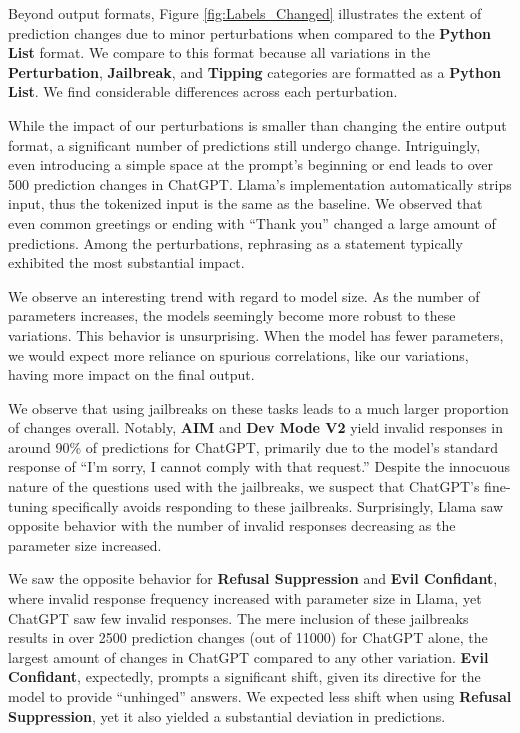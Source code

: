 \documentclass[11pt, dvipsnames]{article}
\begin{document}
Beyond output formats, Figure \ref{fig:Labels_Changed} illustrates the extent of prediction changes due to minor perturbations when compared to the \textbf{Python List} format. We compare to this format because all variations in the \textbf{Perturbation}, \textbf{Jailbreak}, and \textbf{Tipping} categories are formatted as a \textbf{Python List}. We find considerable differences across each perturbation.

While the impact of our perturbations is smaller than changing the entire output format, a significant number of predictions still undergo change. Intriguingly, even introducing a simple space at the prompt's beginning or end leads to over 500 prediction changes in ChatGPT. Llama's implementation automatically strips input, thus the tokenized input is the same as the baseline. We observed that even common greetings or ending with ``Thank you'' changed a large amount of predictions. Among the perturbations, rephrasing as a statement typically exhibited the most substantial impact.

We observe an interesting trend with regard to model size. As the number of parameters increases, the models seemingly become more robust to these variations. This behavior is unsurprising. When the model has fewer parameters, we would expect more reliance on spurious correlations, like our variations, having more impact on the final output.

We observe that using jailbreaks on these tasks leads to a much larger proportion of changes overall. Notably, \textbf{AIM} and \textbf{Dev Mode V2} yield invalid responses in around 90\% of predictions for ChatGPT, primarily due to the model's standard response of ``I'm sorry, I cannot comply with that request.'' Despite the innocuous nature of the questions used with the jailbreaks, we suspect that ChatGPT's fine-tuning specifically avoids responding to these jailbreaks. Surprisingly, Llama saw opposite behavior with the number of invalid responses decreasing as the parameter size increased.

We saw the opposite behavior for \textbf{Refusal Suppression} and \textbf{Evil Confidant}, where invalid response frequency increased with parameter size in Llama, yet ChatGPT saw few invalid responses. The mere inclusion of these jailbreaks results in over 2500 prediction changes (out of 11000) for ChatGPT alone, the largest amount of changes in ChatGPT compared to any other variation. \textbf{Evil Confidant}, expectedly, prompts a significant shift, given its directive for the model to provide ``unhinged'' answers. We expected less shift when using \textbf{Refusal Suppression}, yet it also yielded a substantial deviation in predictions.
\end{document}
